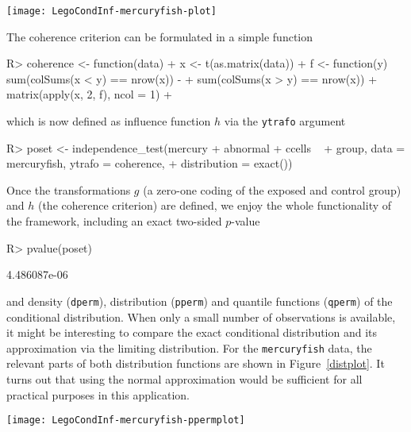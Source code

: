 \documentclass{article}
\newcommand{\Robject}[1]{\texttt{#1}}
\newcommand{\Rcmd}[1]{\texttt{#1}}
\newenvironment{Schunk}{}{}
\begin{document}
\begin{sidewaysfigure}
\begin{center}
\texttt{[image: LegoCondInf-mercuryfish-plot]}
\caption{\Robject{mercuryfish} data: 
         Distribution of all three response variables in the exposed group
         and control group. \label{mercurybox}}
\end{center}
\end{sidewaysfigure}
The coherence criterion can be formulated in a simple function
\begin{Schunk}
\begin{Sinput}
R> coherence <- function(data) {
+     x <- t(as.matrix(data))
+     f <- function(y) sum(colSums(x < y) == nrow(x)) - 
+         sum(colSums(x > y) == nrow(x))
+     matrix(apply(x, 2, f), ncol = 1)
+ }
\end{Sinput}
\end{Schunk}
which is now defined as influence function $h$ via the \Rcmd{ytrafo} argument
\begin{Schunk}
\begin{Sinput}
R> poset <- independence_test(mercury + abnormal + ccells ~ 
+     group, data = mercuryfish, ytrafo = coherence, 
+     distribution = exact())
\end{Sinput}
\end{Schunk}
Once the transformations $g$ (a zero-one coding of the exposed and control
group) and $h$ (the coherence criterion) are defined, we enjoy the whole
functionality of the framework, including an exact two-sided $p$-value
\begin{Schunk}
\begin{Sinput}
R> pvalue(poset)
\end{Sinput}
\begin{Soutput}
[1] 4.486087e-06
\end{Soutput}
\end{Schunk}
and density (\Rcmd{dperm}), distribution (\Rcmd{pperm}) and quantile functions 
(\Rcmd{qperm}) of the conditional distribution. When only a small number of
observations is available, it might be interesting to compare the exact
conditional distribution and its approximation via the limiting distribution.
For the \Robject{mercuryfish} data, the relevant parts of 
both distribution functions are shown in Figure~\ref{distplot}. It 
turns out that using the normal approximation would be sufficient for all practical
purposes in this application.

\begin{sidewaysfigure}
\begin{center}
\texttt{[image: LegoCondInf-mercuryfish-ppermplot]}
\caption{\Robject{mercuryfish} data: 
         Conditional distribution and asymptotic normal approximation 
         for the POSET test. \label{distplot}}
\end{center}
\end{sidewaysfigure}
\end{document}
